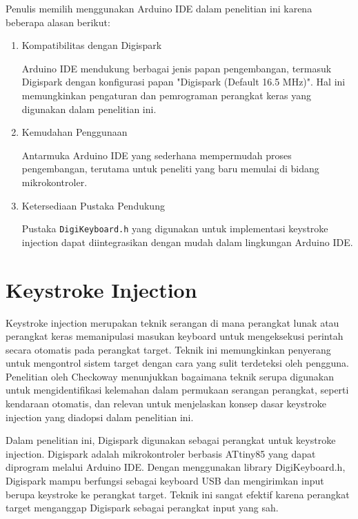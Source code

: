 Penulis memilih menggunakan Arduino IDE dalam penelitian ini karena beberapa alasan berikut:
\begin{enumerate}
    \item{Kompatibilitas dengan Digispark}
    
    Arduino IDE mendukung berbagai jenis papan pengembangan, termasuk Digispark dengan konfigurasi papan "Digispark (Default 16.5 MHz)". Hal ini memungkinkan pengaturan dan pemrograman perangkat keras yang digunakan dalam penelitian ini.
    
    \item{Kemudahan Penggunaan}
    
    Antarmuka Arduino IDE yang sederhana mempermudah proses pengembangan, terutama untuk peneliti yang baru memulai di bidang mikrokontroler.
    
    \item{Ketersediaan Pustaka Pendukung}
    
    Pustaka \texttt{DigiKeyboard.h} yang digunakan untuk implementasi keystroke injection dapat diintegrasikan dengan mudah dalam lingkungan Arduino IDE.
    
\end{enumerate}

\section{Keystroke Injection}
Keystroke injection merupakan teknik serangan di mana perangkat lunak atau perangkat keras memanipulasi masukan keyboard untuk mengeksekusi perintah secara otomatis pada perangkat target. Teknik ini memungkinkan penyerang untuk mengontrol sistem target dengan cara yang sulit terdeteksi oleh pengguna. Penelitian oleh Checkoway \citep{checkoway2011automotive} menunjukkan bagaimana teknik serupa digunakan untuk mengidentifikasi kelemahan dalam permukaan serangan perangkat, seperti kendaraan otomatis, dan relevan untuk menjelaskan konsep dasar keystroke injection yang diadopsi dalam penelitian ini.

Dalam penelitian ini, Digispark digunakan sebagai perangkat untuk keystroke injection. Digispark adalah mikrokontroler berbasis ATtiny85 yang dapat diprogram melalui Arduino IDE. Dengan menggunakan library DigiKeyboard.h, Digispark mampu berfungsi sebagai keyboard USB dan mengirimkan input berupa keystroke ke perangkat target. Teknik ini sangat efektif karena perangkat target menganggap Digispark sebagai perangkat input yang sah.

